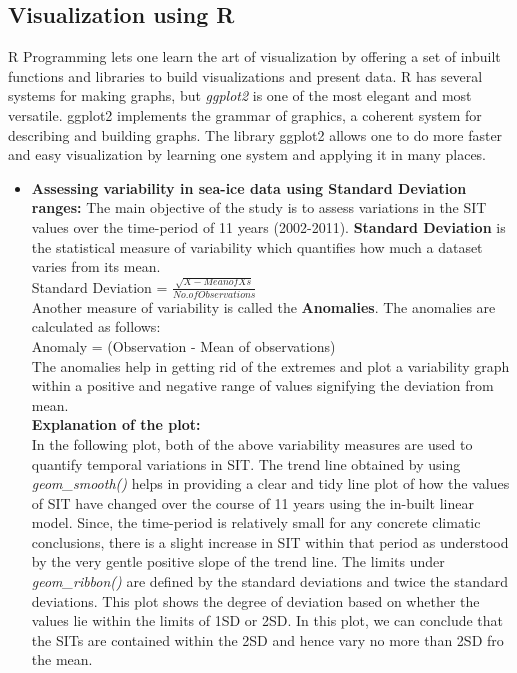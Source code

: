\documentclass{article} %
\begin{document}

\subsection{Visualization using R}

R Programming lets one learn the art of visualization by offering a set of inbuilt functions and libraries to build visualizations and present data. R has several systems for making graphs, but {\it ggplot2} is one of the most elegant and most versatile. ggplot2 implements the grammar of graphics, a coherent system for describing and building graphs.  The library ggplot2 allows one to do more faster and easy visualization by learning one system and applying it in many places.\\

\begin{itemize}
    \item {\bf Assessing variability in sea-ice data using Standard Deviation ranges:}
    The main objective of the study is to assess variations in the SIT values over the time-period of 11 years (2002-2011). {\bf Standard Deviation} is the statistical measure of variability which quantifies how much a dataset varies from its mean. \\
    
    Standard Deviation = $\frac{\sqrt{X-Mean of Xs}}{No. of Observations}$ \\
    
    Another measure of variability is called the {\bf Anomalies}. The anomalies are calculated as follows:\\
    
    Anomaly = (Observation - Mean of observations)\\
    
    The anomalies help in getting rid of the extremes and plot a variability graph within a positive and negative range of values signifying the deviation from mean. \\
    
    {\bf Explanation of the plot:} \\
    In the following plot, both of the above variability measures are used to quantify temporal variations in SIT.  The trend line obtained by using {\it geom\_smooth()} helps in providing a clear and tidy line plot of how the values of SIT have changed over the course of 11 years using the in-built linear model. Since, the time-period is relatively small for any concrete climatic conclusions, there is a slight increase in SIT within that period as understood by the very gentle positive slope of the trend line.  
    The limits under {\it geom\_ribbon()} are defined by the standard deviations and twice the standard deviations. This plot shows the degree of deviation based on whether the values lie within the limits of 1SD or 2SD. 
    In this plot, we can conclude that the SITs are contained within the 2SD and hence vary no more than 2SD fro the mean.
    
\end{itemize}
\end{document}
